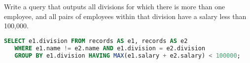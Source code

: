 \question Write a query that outputs all divisions for which there is more than one employee,
and all pairs of employees within that division have a salary less than 100,000.
\begin{solution}[1.5in]
\begin{lstlisting}[language=SQL]
SELECT e1.division FROM records AS e1, records AS e2 
   WHERE e1.name != e2.name AND e1.division = e2.division 
   GROUP BY e1.division HAVING MAX(e1.salary + e2.salary) < 100000;
\end{lstlisting}
\end{solution}
